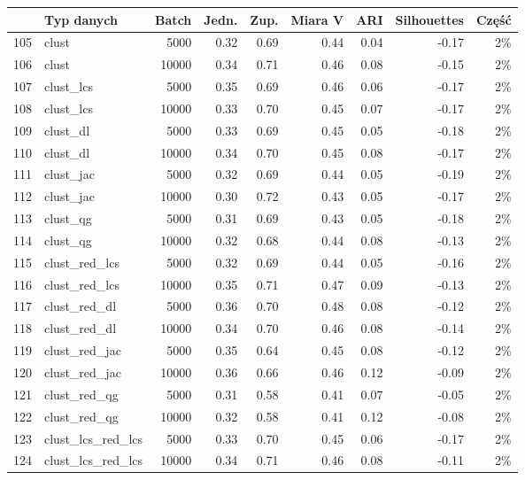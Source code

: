 \documentclass{praca1}
\begin{document}
\begin{table}[!h]
\centering
\begin{tabular}{|rlr|rrr|rr|r|}
\hline
  & Typ danych & Batch & Jedn. & Zup. & Miara V & ARI & Silhouettes & Część \\ 
  \hline
105 & clust & 5000 & 0.32 & 0.69 & 0.44 & 0.04 & -0.17 & 2\% \\ 
  106 & clust & 10000 & 0.34 & 0.71 & 0.46 & 0.08 & -0.15 & 2\% \\ 
   \hline
107 & clust\_lcs & 5000 & 0.35 & 0.69 & 0.46 & 0.06 & -0.17 & 2\% \\ 
  108 & clust\_lcs & 10000 & 0.33 & 0.70 & 0.45 & 0.07 & -0.17 & 2\% \\ 
   \hline
109 & clust\_dl & 5000 & 0.33 & 0.69 & 0.45 & 0.05 & -0.18 & 2\% \\ 
  110 & clust\_dl & 10000 & 0.34 & 0.70 & 0.45 & 0.08 & -0.17 & 2\% \\ 
   \hline
111 & clust\_jac & 5000 & 0.32 & 0.69 & 0.44 & 0.05 & -0.19 & 2\% \\ 
  112 & clust\_jac & 10000 & 0.30 & 0.72 & 0.43 & 0.05 & -0.17 & 2\% \\ 
   \hline
113 & clust\_qg & 5000 & 0.31 & 0.69 & 0.43 & 0.05 & -0.18 & 2\% \\ 
  114 & clust\_qg & 10000 & 0.32 & 0.68 & 0.44 & 0.08 & -0.13 & 2\% \\ 
   \hline
115 & clust\_red\_lcs & 5000 & 0.32 & 0.69 & 0.44 & 0.05 & -0.16 & 2\% \\ 
  116 & clust\_red\_lcs & 10000 & 0.35 & 0.71 & 0.47 & 0.09 & -0.13 & 2\% \\ 
   \hline
117 & clust\_red\_dl & 5000 & 0.36 & 0.70 & 0.48 & 0.08 & -0.12 & 2\% \\ 
  118 & clust\_red\_dl & 10000 & 0.34 & 0.70 & 0.46 & 0.08 & -0.14 & 2\% \\ 
   \hline
119 & clust\_red\_jac & 5000 & 0.35 & 0.64 & 0.45 & 0.08 & -0.12 & 2\% \\ 
  120 & clust\_red\_jac & 10000 & 0.36 & 0.66 & 0.46 & 0.12 & -0.09 & 2\% \\ 
   \hline
121 & clust\_red\_qg & 5000 & 0.31 & 0.58 & 0.41 & 0.07 & -0.05 & 2\% \\ 
  122 & clust\_red\_qg & 10000 & 0.32 & 0.58 & 0.41 & 0.12 & -0.08 & 2\% \\ 
   \hline
123 & clust\_lcs\_red\_lcs & 5000 & 0.33 & 0.70 & 0.45 & 0.06 & -0.17 & 2\% \\ 
  124 & clust\_lcs\_red\_lcs & 10000 & 0.34 & 0.71 & 0.46 & 0.08 & -0.11 & 2\% \\ 

\end{tabular}
\end{table}
\end{document}
